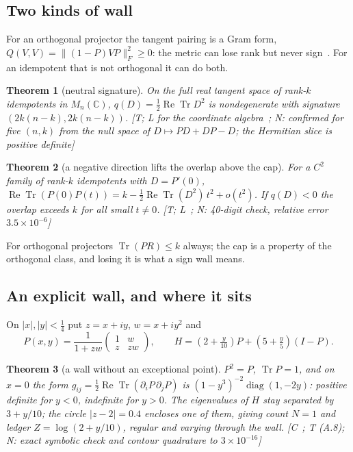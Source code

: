 \documentclass[11pt]{article}
\newtheorem{theorem}{Theorem}
\theoremstyle{definition}
\newcommand{\grade}[1]{\textsf{\small[#1]}}
\newcommand{\Tr}{\operatorname{Tr}}
\newcommand{\F}[1]{\lVert #1\rVert_F}
\begin{document}
\subsection{Two kinds of wall}

For an orthogonal projector the tangent pairing is a Gram form, $Q(V,V)=\F{(1-P)VP}^2\ge0$: the metric can lose rank but never sign~\cite{LKL}. For an idempotent that is not orthogonal it can do both.

\begin{theorem}[neutral signature]\label{thm:neutral}
On the full real tangent space of rank-$k$ idempotents in $M_n(\mathbb C)$, $q(D)=\tfrac12\operatorname{Re}\Tr D^2$ is nondegenerate with signature $(2k(n-k),2k(n-k))$. \grade{T; L for the coordinate algebra~\cite{GLO}; N: confirmed for five $(n,k)$ from the null space of $D\mapsto PD+DP-D$; the Hermitian slice is positive definite}
\end{theorem}

\begin{theorem}[a negative direction lifts the overlap above the cap]\label{thm:cap}
For a $C^2$ family of rank-$k$ idempotents with $D=P'(0)$, $\operatorname{Re}\Tr(P(0)P(t))=k-\tfrac12\operatorname{Re}\Tr(D^2)\,t^2+o(t^2)$. If $q(D)<0$ the overlap exceeds $k$ for all small $t\ne0$. \grade{T; L~\cite{GLO}; N: 40-digit check, relative error $3.5\times10^{-6}$}
\end{theorem}

For orthogonal projectors $\Tr(PR)\le k$ always; the cap is a property of the orthogonal class, and losing it is what a sign wall means.

\subsection{An explicit wall, and where it sits}

On $|x|,|y|<\tfrac14$ put $z=x+iy$, $w=x+iy^2$ and
\begin{equation}\label{eq:chart}
P(x,y)=\frac1{1+zw}\begin{pmatrix}1&w\\z&zw\end{pmatrix},\qquad H=(2+\tfrac y{10})P+(5+\tfrac y5)(I-P).
\end{equation}

\begin{theorem}[a wall without an exceptional point]\label{thm:chart}
$P^2=P$, $\Tr P=1$, and on $x=0$ the form $g_{ij}=\tfrac12\operatorname{Re}\Tr(\partial_iP\,\partial_jP)$ is $(1-y^3)^{-2}\operatorname{diag}(1,-2y)$: positive definite for $y<0$, indefinite for $y>0$. The eigenvalues of $H$ stay separated by $3+y/10$; the circle $|z-2|=0.4$ encloses one of them, giving count $N=1$ and ledger $Z=\log(2+y/10)$, regular and varying through the wall. \grade{C~\cite{GLO}; T (A.8); N: exact symbolic check and contour quadrature to $3\times10^{-16}$}
\end{theorem}
\end{document}

